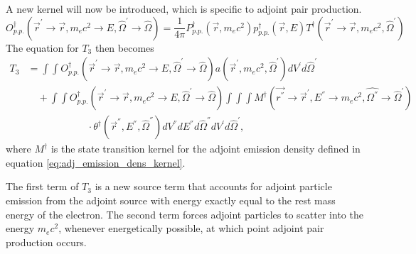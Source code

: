A new kernel will now be introduced, which is specific to adjoint pair 
production.
\begin{equation}
  O_{p.p.}^{\dagger}(\vec{r}^{'} \to \vec{r}, m_ec^2 \to E, \hat{\Omega}^{'}
  \to \hat{\Omega}) = \frac{1}{4\pi}P_{p.p.}^{\dagger}(\vec{r},m_ec^2)
  p_{p.p.}^{\dagger}(\vec{r},E) 
  T^{\dagger}(\vec{r}^{'} \to \vec{r},m_ec^2,\hat{\Omega}^{'})
\end{equation}
The equation for $T_3$ then becomes 
\begin{align}
  T_3 & = \int\int 
  O_{p.p.}^{\dagger}(\vec{r}^{'} \to \vec{r}, m_ec^2 \to E, \hat{\Omega}^{'}
  \to \hat{\Omega}) a(\vec{r}^{'},m_ec^2,\hat{\Omega}^{'}) 
  dV^{'}d\hat{\Omega}^{'} \nonumber \\
  & \quad + \int\int 
  O_{p.p.}^{\dagger}(\vec{r}^{'} \to \vec{r}, m_ec^2 \to E, \hat{\Omega}^{'}
  \to \hat{\Omega}) \int\int\int
  M^{\dagger}(\vec{r^{''}} \to \vec{r}^{'},E^{''} \to m_ec^2,\hat{\Omega^{''}} \to 
  \hat{\Omega}^{'}) \nonumber \\
  & \qquad\qquad\qquad\cdot
  \theta^{\dagger}(\vec{r}^{''},E^{''},\hat{\Omega}^{''}) 
  dV^{''}dE^{''}d\hat{\Omega}^{''}dV^{'}d\hat{\Omega}^{'},
  \label{eq:pair_production_term}
\end{align}
where $M^{\dagger}$ is the state transition kernel for the adjoint emission 
density defined in equation \ref{eq:adj_emission_dens_kernel}.

The first term of $T_3$ is a new source term that accounts for adjoint particle 
emission from the adjoint source with energy exactly equal to the rest mass 
energy of the electron. The second term forces adjoint particles to 
scatter into the energy $m_ec^2$, whenever energetically possible, at which 
point adjoint pair production occurs.

